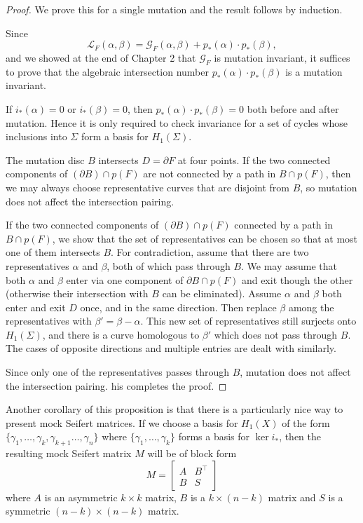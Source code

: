\documentclass[12pt]{report}
\theoremstyle{upright}
\begin{document}
\begin{proof}
	We prove this for a single mutation and the result follows by induction.
	
	Since
	\[\mathcal{L}_{F}(\alpha, \beta) = \mathcal{G}_{F}(\alpha, \beta) + p_{*}(\alpha) \cdot p_{*}(\beta),\]
	and we showed at the end of Chapter 2 that $\mathcal{G}_{F}$ is mutation invariant, it suffices to prove that the algebraic intersection number $p_{*}(\alpha) \cdot p_{*}(\beta)$ is a mutation invariant.
	
	If $i_{*}(\alpha) = 0$ or $i_{*}(\beta) = 0$, then $p_{*}(\alpha) \cdot p_{*}(\beta) = 0$ both before and after mutation. Hence it is only required to check invariance for a set of cycles whose inclusions into $\Sigma$ form a basis for $H_{1}(\Sigma)$.
	
	The mutation disc $B$ intersects $D = \partial F$ at four points. If the two connected components of $(\partial B) \cap p(F)$ are not connected by a path in $B \cap p(F)$, then we may always choose representative curves that are disjoint from $B$, so mutation does not affect the intersection pairing.
	
	If the two connected components of $(\partial B) \cap p(F)$ connected by a path in $B \cap p(F)$, we show that the set of representatives can be chosen so that at most one of them intersects $B$. For contradiction, assume that there are two representatives $\alpha$ and $\beta$, both of which pass through $B$. We may assume that both $\alpha$ and $\beta$ enter via one component of $\partial B \cap p(F)$ and exit though the other (otherwise their intersection with $B$ can be eliminated). Assume $\alpha$ and $\beta$ both enter and exit $D$ once, and in the same direction. Then replace $\beta$ among the representatives with $\beta' = \beta - \alpha$. This new set of representatives still surjects onto $H_{1}(\Sigma)$, and there is a curve homologous to $\beta'$ which does not pass through $B$. The cases of opposite directions and multiple entries are dealt with similarly.
	
	Since only one of the representatives passes through $B$, mutation does not affect the intersection pairing. his completes the proof.
\end{proof}


Another corollary of this proposition is that there is a particularly nice way to present mock Seifert matrices. If we choose a basis for $H_{1}(X)$ of the form $\{\gamma_{1}, \dots, \gamma_{k}, \gamma_{k + 1} \dots, \gamma_{n}\}$ where $\{\gamma_{1}, \dots, \gamma_{k}\}$ forms a basis for $\ker i_{*}$, then the resulting mock Seifert matrix $M$ will be of block form
\[M = \begin{bmatrix}
	A & B^{\top} \\
	B & S
\end{bmatrix}\]
where $A$ is an asymmetric $k \times k$ matrix, $B$ is a $k \times (n - k)$ matrix and $S$ is a symmetric $(n - k) \times (n - k)$ matrix.
\end{document}
